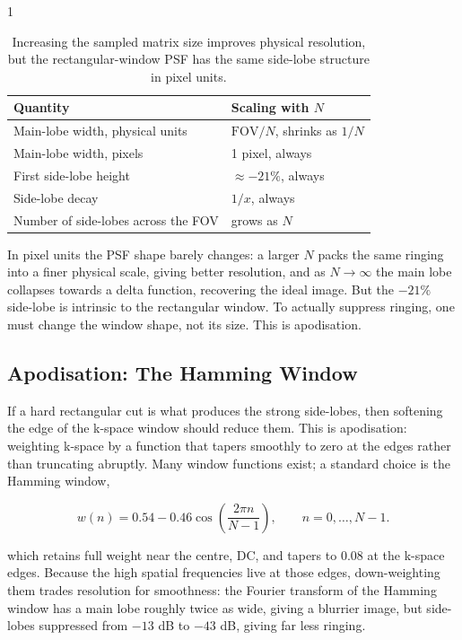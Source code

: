 \begin{spacing}{1}
\begin{table}
    \centering
    \begin{tabular}{ll}
        \toprule
        Quantity & Scaling with \(N\) \\
        \midrule
        Main-lobe width, physical units & \(\mathrm{FOV}/N\), shrinks as \(1/N\) \\
        Main-lobe width, pixels & 1 pixel, always \\
        First side-lobe height & \(\approx -21\%\), always \\
        Side-lobe decay & \(1/x\), always \\
        Number of side-lobes across the FOV & grows as \(N\) \\
        \bottomrule
    \end{tabular}
    \caption{Increasing the sampled matrix size improves physical resolution, but the rectangular-window PSF has the same side-lobe structure in pixel units.}
    \label{tab:app-dirichlet-scaling}
\end{table}

In pixel units the PSF shape barely changes: a larger \(N\) packs the
same ringing into a finer physical scale, giving better resolution, and
as \(N\to\infty\) the main lobe collapses towards a delta function,
recovering the ideal image. But the \(-21\%\) side-lobe is intrinsic to
the rectangular window. To actually suppress ringing, one must change the
window shape, not its size. This is apodisation.

\subsection{Apodisation: The Hamming Window}

If a hard rectangular cut is what produces the strong side-lobes, then
softening the edge of the k-space window should reduce them. This is
apodisation: weighting k-space by a function that tapers smoothly to zero
at the edges rather than truncating abruptly. Many window functions
exist; a standard choice is the Hamming window,


\begin{equation}
    w(n) =
    0.54 - 0.46\cos\left(\frac{2\pi n}{N-1}\right),
    \qquad n=0,\dots,N-1.
\end{equation}

which retains full weight near the centre, DC, and tapers to 0.08 at the
k-space edges. Because the high spatial frequencies live at those edges,
down-weighting them trades resolution for smoothness: the Fourier
transform of the Hamming window has a main lobe roughly twice as wide,
giving a blurrier image, but side-lobes suppressed from \(-13\) dB to
\(-43\) dB, giving far less ringing.


\end{spacing}
